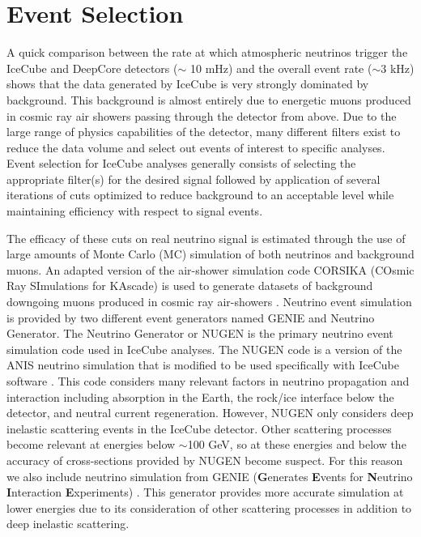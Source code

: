 \documentclass{gatech-thesis}
\begin{document}
\chapter{Event Selection}
A quick comparison between the rate at which atmospheric neutrinos trigger the IceCube and DeepCore detectors ($\sim$ 10 mHz) and the overall event rate ($\sim 3$ kHz) shows that the data generated by IceCube is very strongly dominated by background. This background is almost entirely due to energetic muons produced in cosmic ray air showers passing through the detector from above. Due to the large range of physics capabilities of the detector, many different filters exist to reduce the data volume and select out events of interest to specific analyses. Event selection for IceCube analyses generally consists of selecting the appropriate filter(s) for the desired signal followed by application of several iterations of cuts optimized to reduce background to an acceptable level while maintaining efficiency with respect to signal events.

The efficacy of these cuts on real neutrino signal is estimated through the use of large amounts of Monte Carlo (MC) simulation of both neutrinos and background muons. An adapted version of the air-shower simulation code CORSIKA (COsmic Ray SImulations for KAscade) is used to generate datasets of background downgoing  muons produced in cosmic ray air-showers \cite{1998cmcc.book.....H}.  Neutrino event simulation is provided by two different event generators named GENIE and Neutrino Generator. The Neutrino Generator or NUGEN is the primary neutrino event simulation code used in IceCube analyses. The NUGEN code is a version of the ANIS neutrino simulation that is modified to be used specifically with IceCube software \cite{2005CoPhC.172..203G}. This code considers many relevant factors in neutrino propagation and interaction including absorption in the Earth, the rock/ice interface below the detector, and neutral current regeneration. However, NUGEN only considers deep inelastic scattering events in the IceCube detector. Other scattering processes become relevant at energies below $\sim$100 GeV, so at these energies and below the accuracy of cross-sections provided by NUGEN become suspect. For this reason we also include neutrino simulation from GENIE (\textbf{G}enerates \textbf{E}vents for \textbf{N}eutrino \textbf{I}nteraction \textbf{E}xperiments) \cite{2010NIMPA.614...87A}. This generator provides more accurate simulation at lower energies due to its consideration of other scattering processes in addition to deep inelastic scattering.
\end{document}
